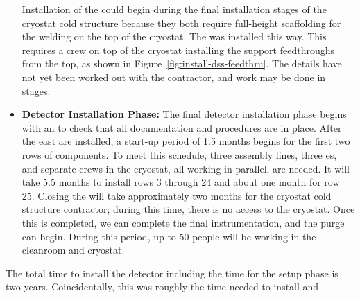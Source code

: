 \begin{itemize}
    Installation of the  could begin during the final installation stages of the cryostat cold structure because they both require full-height scaffolding for the welding on the top of the cryostat. The   was installed this way. This requires a crew on top of the cryostat installing the  support feedthroughs from the top, as shown in Figure~\ref{fig:install-dss-feedthru}.  The details have not yet been worked out with the contractor, and work may be done in stages.

   
    \item {\bf Detector Installation Phase:} The final detector installation phase begins with an  to check that all documentation and procedures are in place. After the east  are installed, a start-up period of 1.5 months begins for the first two rows of  components.  To meet this schedule, three assembly lines, three \coldbox{}es, and separate crews in the cryostat, all working in parallel, are needed.  It will take 5.5 months to install rows 3 through 24 and about one month for row 25. Closing the  will take approximately two months for the cryostat cold structure contractor; during this time, there is no access to the cryostat.  Once this is completed, we can complete the final instrumentation, and the purge can begin. During this period, up to 50 people will be working in the cleanroom and cryostat.
    
\end{itemize}

The total time to install the detector including the time for the setup phase is two years. Coincidentally, this was roughly the time needed to install  and .

  